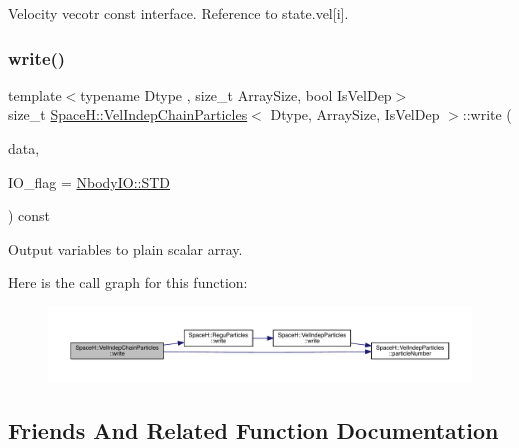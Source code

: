 Velocity vecotr const interface. Reference to state.\+vel\mbox{[}i\mbox{]}. 

\mbox{\label{class_space_h_1_1_vel_indep_chain_particles_aa67fcd1ff597b37aa49020eec198fd0c}} 
\subsubsection{\texorpdfstring{write()}{write()}}
{\footnotesize\ttfamily template$<$typename Dtype , size\+\_\+t Array\+Size, bool Is\+Vel\+Dep$>$ \\
size\+\_\+t \mbox{\hyperlink{class_space_h_1_1_vel_indep_chain_particles}{Space\+H\+::\+Vel\+Indep\+Chain\+Particles}}$<$ Dtype, Array\+Size, Is\+Vel\+Dep $>$\+::write (\begin{DoxyParamCaption}\item[{\mbox{\hyperlink{class_space_h_1_1_vel_indep_particles_abca40159a816385790d5a6fd19c1dc6d}{Scalar\+Buffer}} \&}]{data,  }\item[{const \mbox{\hyperlink{namespace_space_h_a296a8bae763a754564bfdce216e31b59}{Nbody\+IO}}}]{I\+O\+\_\+flag = {\ttfamily \mbox{\hyperlink{namespace_space_h_a296a8bae763a754564bfdce216e31b59ac6ce23be5d350ce18a665427d2d950f7}{Nbody\+I\+O\+::\+S\+TD}}} }\end{DoxyParamCaption}) const\hspace{0.3cm}{\ttfamily [inline]}}



Output variables to plain scalar array. 

Here is the call graph for this function\+:
\nopagebreak
\begin{figure}[H]
\begin{center}
\leavevmode
\includegraphics[width=350pt]{class_space_h_1_1_vel_indep_chain_particles_aa67fcd1ff597b37aa49020eec198fd0c_cgraph}
\end{center}
\end{figure}


\subsection{Friends And Related Function Documentation}
\mbox{\label{class_space_h_1_1_vel_indep_chain_particles_a87208692311239cfefd6d58ea4ce39ce}} 

